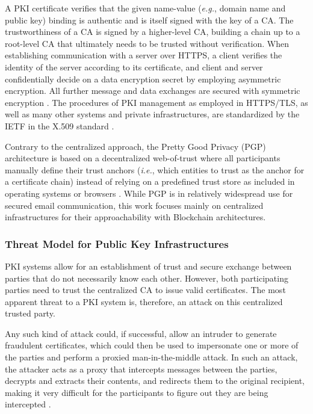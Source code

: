A PKI certificate verifies that the given name-value (\textit{e.g.}, domain name and public key) binding is authentic and is itself signed with the key of a CA. The trustworthiness of a CA is signed by a higher-level CA, building a chain up to a root-level CA that ultimately needs to be trusted without verification. When establishing communication with a server over HTTPS, a client verifies the identity of the server according to its certificate, and client and server confidentially decide on a data encryption secret by employing asymmetric encryption. All further message and data exchanges are secured with symmetric encryption \cite{straub_tobias_usability_2006}. The procedures of PKI management as employed in HTTPS/TLS, as well as many other systems and private infrastructures, are standardized by the IETF in the X.509 standard \cite{adams_internet_2015}.

Contrary to the centralized approach, the Pretty Good Privacy (PGP) architecture is based on a decentralized web-of-trust where all participants manually define their trust anchors (\textit{i.e.}, which entities to trust as the anchor for a certificate chain) instead of relying on a predefined trust store as included in operating systems or browsers \cite{straub_tobias_usability_2006}. While PGP is in relatively widespread use for secured email communication, this work focuses mainly on centralized infrastructures for their approachability with Blockchain architectures.


\subsubsection{Threat Model for Public Key Infrastructures}
\label{subsubsec:threat_model_pki}

PKI systems allow for an establishment of trust and secure exchange between parties that do not necessarily know each other. However, both participating parties need to trust the centralized CA to issue valid certificates. The most apparent threat to a PKI system is, therefore, an attack on this centralized trusted party.

Any such kind of attack could, if successful, allow an intruder to generate fraudulent certificates, which could then be used to impersonate one or more of the parties and perform a proxied man-in-the-middle attack. In such an attack, the attacker acts as a proxy that intercepts messages between the parties, decrypts and extracts their contents, and redirects them to the original recipient, making it very difficult for the participants to figure out they are being intercepted \cite{zusman_criminal_2008}.

